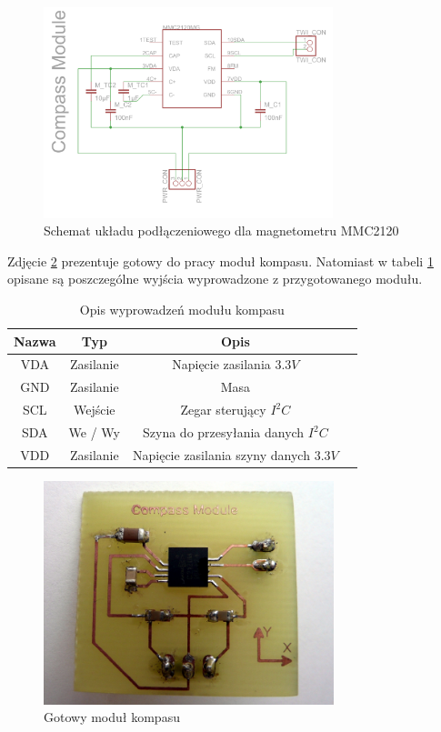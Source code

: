 \begin{figure}[!ht]
 \centering
 \includegraphics[width=0.75\textwidth]{../images/ch04/mmc2120mgsch.png}
 \caption{Schemat układu podłączeniowego dla magnetometru MMC2120}
 \label{fig:MMC2120Sch}
\end{figure}

Zdjęcie \ref{fig:MMC2120Module} prezentuje gotowy do pracy moduł kompasu.
Natomiast w tabeli \ref{tab:MMC2120ModOut} opisane są poszczególne wyjścia
wyprowadzone z przygotowanego modułu.
 
\begin{table}[hb]
  \centering
  \caption{Opis wyprowadzeń modułu kompasu}
  \begin{tabular}{ | c | c | c | p{1.75cm} |} \hline
    Nazwa & Typ & Opis \\ \hline
    VDA & Zasilanie & Napięcie zasilania $3.3V$ \\
    GND & Zasilanie & Masa \\
    SCL & Wejście & Zegar sterujący $I^{2}C$ \\
    SDA & We / Wy & Szyna do przesyłania danych $I^{2}C$ \\
    VDD & Zasilanie & Napięcie zasilania szyny danych $3.3V$ \\ \hline
  \end{tabular}
  \label{tab:MMC2120ModOut}
\end{table}
\begin{figure}[!ht]
 \centering
 \includegraphics[height=65mm]{../images/ch04/compassmodule.jpg}
 \caption{Gotowy moduł kompasu}
 \label{fig:MMC2120Module}
\end{figure}

